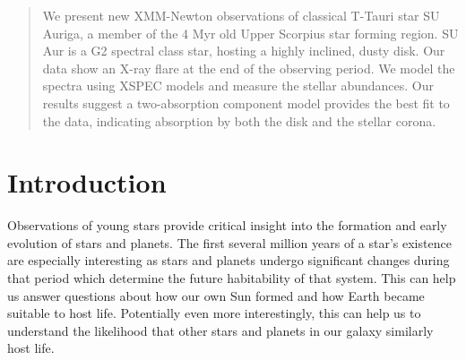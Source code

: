 \documentclass[twocolumn]{aastex631}
\begin{document}
\title{}


\author[0000-0001-7336-7725]{Mackenna L. Wood}%

\author[0000-0003-3654-1602]{Hans M. Gunther}%

\begin{abstract}
We present new XMM-Newton observations of classical T-Tauri star SU Auriga, a member of the 4 Myr old Upper Scorpius star forming region. SU Aur is a G2 spectral class star, hosting a highly inclined, dusty disk. Our data show an X-ray flare at the end of the observing period. We model the spectra using XSPEC models and measure the stellar abundances. Our results suggest a two-absorption component model provides the best fit to the data, indicating absorption by both the disk and the stellar corona.
\end{abstract}


\section{Introduction} \label{sec:intro}




Observations of young stars provide critical insight into the formation and early evolution of stars and planets. The first several million years of a star's existence are especially interesting as stars and planets undergo significant changes during that period which determine the future habitability of that system. This can help us answer questions about how our own Sun formed and how Earth became suitable to host life. Potentially even more interestingly, this can help us to understand the likelihood that other stars and planets in our galaxy similarly host life. 
\end{document}
